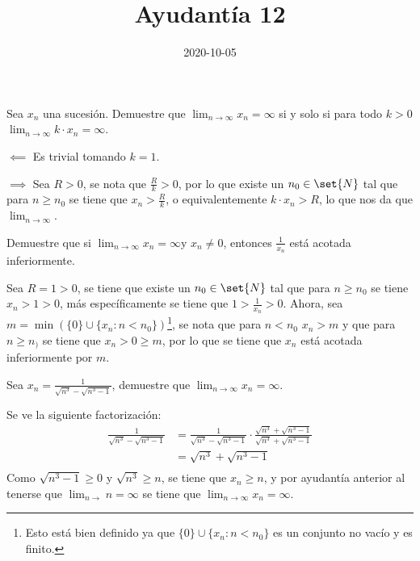\documentclass{ayudantia}
\title{Ayudantía 12}
\date{2020-10-05}
\begin{document}
\maketitle

\begin{prob}
    Sea \(x_n\) una sucesión. Demuestre que \(\lim_{n\rightarrow\infty}x_n=\infty\) si y solo si para todo \(k>0\) \(\lim_{n\rightarrow\infty}k\cdot x_n=\infty\).
\end{prob}

\begin{ans}
    \begin{sol}
        \(\impliedby\) Es trivial tomando \(k=1\).

        \(\implies\) Sea \(R>0\), se nota que \(\frac{R}k>0\), por lo que existe un \(n_0\in\set{N}\) tal que para \(n\geq n_0\) se tiene que \(x_n>\frac{R}k\), o equivalentemente \(k\cdot x_n>R\), lo que nos da que \(\lim_{n\rightarrow\infty}\).
    \end{sol}
\end{ans}


\begin{prob}
    Demuestre que si \(\lim_{n\rightarrow\infty}x_n=\infty\)y \(x_n\neq0\), entonces \(\frac1{x_n}\) está acotada inferiormente.
\end{prob}

\begin{ans}
    \begin{sol}
        Sea \(R=1>0\), se tiene que existe un \(n_0\in\set{N}\) tal que para \(n\geq n_0\) se tiene \(x_n>1>0\), más específicamente se tiene que \(1>\frac1{x_n}>0\). Ahora, sea \(m=\min(\{0\}\cup\{x_n:n<n_0\})\)\footnote{Esto está bien definido ya que \(\{0\}\cup\{x_n:n<n_0\}\) es un conjunto no vacío y es finito.}, se nota que para \(n<n_0\) \(x_n>m\) y que para \(n\geq n_)\) se tiene que \(x_n>0\geq m\), por lo que se tiene que \(x_n\) está acotada inferiormente por \(m\).
    \end{sol}
\end{ans}


\begin{prob}
    Sea \(x_n=\frac1{\sqrt{n^3}-\sqrt{n^3-1}}\), demuestre que \(\lim_{n\rightarrow\infty}x_n=\infty\).
\end{prob}

\begin{ans}
    \begin{sol}
        Se ve la siguiente factorización:
        \begin{align*}
            \frac1{\sqrt{n^3}-\sqrt{n^3-1}}&=\frac1{\sqrt{n^3}-\sqrt{n^3-1}}\cdot\frac{\sqrt{n^3}+\sqrt{n^3-1}}{\sqrt{n^3}+\sqrt{n^3-1}}\\
            &=\sqrt{n^3}+\sqrt{n^3-1}\\
        \end{align*}
        Como \(\sqrt{n^3-1}\geq0\) y \(\sqrt{n^3}\geq n\), se tiene que \(x_n\geq n\), y por ayudantía anterior al tenerse que \(\lim_{n\rightarrow}n=\infty\) se tiene que \(\lim_{n\rightarrow\infty}x_n=\infty\).
    \end{sol}
\end{ans}
\end{document}
